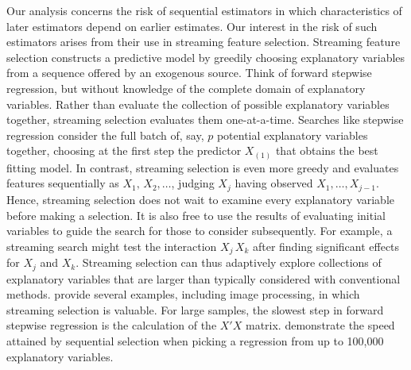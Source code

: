 \documentclass{gSCS2e}
\begin{document}
 Our analysis concerns the risk of sequential estimators in which characteristics of later
 estimators depend on earlier estimates.  Our interest in the risk of such estimators
 arises from their use in streaming feature selection.  Streaming feature selection
 constructs a predictive model by greedily choosing explanatory variables from a sequence
 offered by an exogenous source.  Think of forward stepwise regression, but without
 knowledge of the complete domain of explanatory variables.  Rather than evaluate the
 collection of possible explanatory variables together, streaming selection evaluates them
 one-at-a-time.  Searches like stepwise regression consider the full batch of, say, $p$
 potential explanatory variables together, choosing at the first step the predictor
 $X_{(1)}$ that obtains the best fitting model.  In contrast, streaming selection is even
 more greedy and evaluates features sequentially as $X_1, \, X_2, \ldots$, judging $X_j$
 having observed $X_1, \ldots, X_{j-1}$.  Hence, streaming selection does not wait to
 examine every explanatory variable before making a selection.  It is also free to use the
 results of evaluating initial variables to guide the search for those to consider
 subsequently.  For example, a streaming search might test the interaction $X_j \, X_k$
 after finding significant effects for $X_j$ and $X_k$.  Streaming selection can thus
 adaptively explore collections of explanatory variables that are larger than typically
 considered with conventional methods. \citet{wu13} provide several examples, including
 image processing, in which streaming selection is valuable.  For large samples, the
 slowest step in forward stepwise regression is the calculation of the $X'X$ matrix.
  \citet{fosterlin11} demonstrate the speed attained by sequential selection when picking
 a regression from up to 100,000 explanatory variables.
\end{document}
